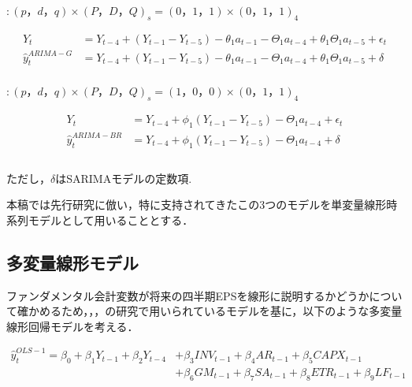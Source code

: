 \documentclass[a4paper，12pt]{jsarticle}
\begin{document}
\cite{griffin1977time} $: (p，d，q) \times (P，D，Q)_s = (0，1，1) \times (0，1，1)_4$

\begin{equation}
  \begin{split}
    Y_t &= Y_{t-4} + (Y_{t-1} - Y_{t-5}) - \theta_1a_{t-1} - \Theta_1a_{t-4} + \theta_1\Theta_1a_{t-5} + \epsilon_t \\
    \hat{y}_t^{ARIMA-G} &= Y_{t-4} + (Y_{t-1} - Y_{t-5}) - \theta_1a_{t-1} - \Theta_1a_{t-4} + \theta_1\Theta_1a_{t-5} + \delta \\
  \end{split}
\end{equation}

\cite*{brown1979univariate} $: (p，d，q) \times (P，D，Q)_s = (1，0，0) \times (0，1，1)_4$

\begin{equation}
  \begin{split}    
    Y_t &= Y_{t-4} + \phi_1(Y_{t-1}-Y_{t-5}) - \Theta_1a_{t-4} + \epsilon_t \\
    \hat{y}_t^{ARIMA-BR} &= Y_{t-4} + \phi_1(Y_{t-1}-Y_{t-5}) - \Theta_1a_{t-4} + \delta \\
    \\
  \end{split}
\end{equation}

ただし，$\delta$はSARIMAモデルの定数項.

本稿では先行研究に倣い，特に支持されてきたこの3つのモデルを単変量線形時系列モデルとして用いることとする．

\subsection{多変量線形モデル}

ファンダメンタル会計変数が将来の四半期EPSを線形に説明するかどうかについて確かめるため，\cite*{lev1993fundamental}，\cite*{abarbanell1997fundamental}，\cite*{lorek1996multivariate}の研究で用いられているモデルを基に，以下のような多変量線形回帰モデルを考える．

\begin{equation}
  \begin{split}
    \label{eq:ols1}
    \hat{y}_t^{OLS-1} = \beta_0 + \beta_1Y_{t-1} + \beta_2Y_{t-4} 
    &+ \beta_3INV_{t-1} + \beta_4AR_{t-1} + \beta_5CAPX_{t-1} \\
    &+ \beta_6GM_{t-1} + \beta_7SA_{t-1} + \beta_8ETR_{t-1} + \beta_9LF_{t-1} \\
  \end{split}
\end{equation}
\end{document}
